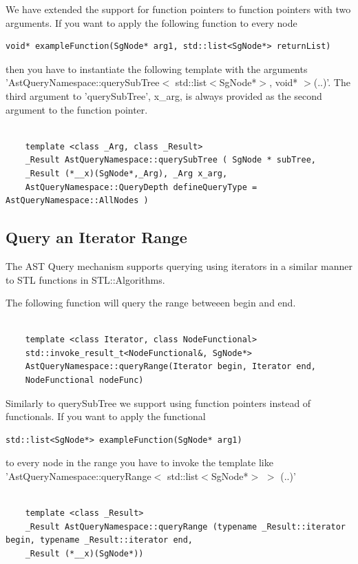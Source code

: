 We have extended the support for function pointers to function pointers with two arguments. If you want to apply the
following function to every node
\begin{verbatim}
void* exampleFunction(SgNode* arg1, std::list<SgNode*> returnList) 
\end{verbatim}
then you have to instantiate the following template with the arguments 'AstQueryNamespace::querySubTree$<$ std::list$<$SgNode*$>$, void* $>$(..)'.
The third argument to 'querySubTree', x\_arg, is always provided as the second argument to the function pointer.
\begin{verbatim}

    template <class _Arg, class _Result> 
    _Result AstQueryNamespace::querySubTree ( SgNode * subTree,
	_Result (*__x)(SgNode*,_Arg), _Arg x_arg,
	AstQueryNamespace::QueryDepth defineQueryType = AstQueryNamespace::AllNodes )
\end{verbatim}




\subsection{Query an Iterator Range}

The AST Query mechanism supports querying using iterators in a similar manner to STL functions in STL::Algorithms.

The following function will query the range betweeen begin and end.
\begin{verbatim}

    template <class Iterator, class NodeFunctional>
    std::invoke_result_t<NodeFunctional&, SgNode*>
    AstQueryNamespace::queryRange(Iterator begin, Iterator end, 
	NodeFunctional nodeFunc)
\end{verbatim}

Similarly to querySubTree we support using function pointers instead of functionals. If you want to apply the
functional
\begin{verbatim}
std::list<SgNode*> exampleFunction(SgNode* arg1) 
\end{verbatim}
to every node in the range you have to invoke the template like 'AstQueryNamespace::queryRange$<$ std::list$<$SgNode*$>$ $>$ (..)'

\begin{verbatim}

    template <class _Result> 
    _Result AstQueryNamespace::queryRange (typename _Result::iterator begin, typename _Result::iterator end,
	_Result (*__x)(SgNode*))
\end{verbatim}

